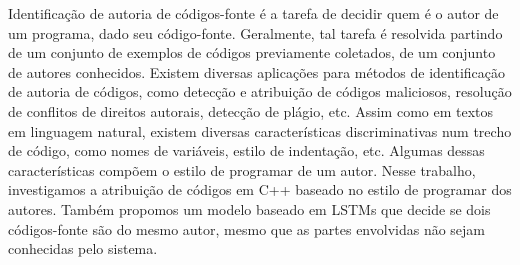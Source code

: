 Identificação de autoria de códigos-fonte é a tarefa de decidir quem é o autor de um programa, dado seu código-fonte. Geralmente, tal tarefa é resolvida partindo de um conjunto de exemplos de códigos previamente coletados, de um conjunto de autores conhecidos. Existem diversas aplicações para métodos de identificação de autoria de códigos, como detecção e atribuição de códigos maliciosos, resolução de conflitos de direitos autorais, detecção de plágio, etc. Assim como em textos em linguagem natural, existem diversas características discriminativas num trecho de código, como nomes de variáveis, estilo de indentação, etc. Algumas dessas características compõem o estilo de programar de um autor. Nesse trabalho, investigamos a atribuição de códigos em C++ baseado no estilo de programar dos autores. Também propomos um modelo baseado em LSTMs que decide se dois códigos-fonte são do mesmo autor, mesmo que as partes envolvidas não sejam conhecidas pelo sistema.